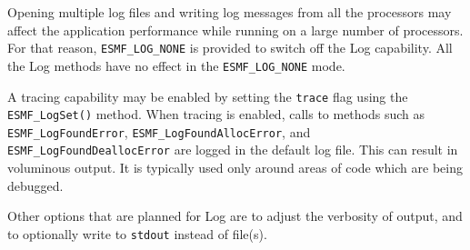 Opening multiple log files and writing log messages from all the processors
may affect the application performance while running on a large number of
processors.  For that reason, {\tt ESMF\_LOG\_NONE} is provided to
switch off the Log capability.  All the Log methods have no effect
in the {\tt ESMF\_LOG\_NONE} mode.

\begin{sloppypar}
A tracing capability may be enabled by setting the {\tt trace} flag
using the {\tt ESMF\_LogSet()} method.  When tracing is enabled, calls to
methods such as {\tt ESMF\_LogFoundError}, {\tt ESMF\_LogFoundAllocError},
and {\tt ESMF\_LogFoundDeallocError} are logged in the default log file.
This can result in voluminous output.  It is typically used only around areas
of code which are being debugged.
\end{sloppypar}
   
Other options that are planned for Log are to adjust the verbosity of output, and to optionally write to {\tt stdout} instead of file(s).




